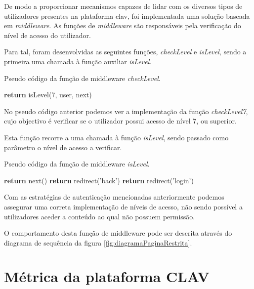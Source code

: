 De modo a proporcionar mecanismos capazes de lidar com os diversos tipos de utilizadores presentes na plataforma \gls{clav}, foi implementada uma solução baseada em \emph{middleware}. As funções de \emph{middleware} são responsáveis pela verificação do nível de acesso do utilizador. 

Para tal, foram desenvolvidas as seguintes funções, \emph{checkLevel} e \emph{isLevel}, sendo a primeira uma chamada à função auxiliar \emph{isLevel}.

\begin{algorithm}
    \caption{Pseudo código da função de middleware \emph{checkLevel}.}
    \begin{algorithmic}[1]
            \State \textbf{return} isLevel(7, user, next)
    \EndFunction
    \end{algorithmic}
\end{algorithm}

No pseudo código anterior podemos ver a implementação da função \emph{checkLevel7}, cujo objectivo é verificar se o utilizador possui acesso de nível 7, ou superior.

Esta função recorre a uma chamada à função \emph{isLevel}, sendo passado como parâmetro o nível de acesso a verificar.

\begin{algorithm}
    \caption{Pseudo código da função de middleware \emph{isLevel}.}
    \begin{algorithmic}[1]
                \State \textbf{return} next()
            \Else
                \State \textbf{return} redirect('back')
            \EndIf
        \Else
            \State \textbf{return} redirect('login')
        \EndIf
    \EndFunction
    \end{algorithmic}
\end{algorithm}

Com as estratégias de autenticação mencionadas anteriormente podemos assegurar uma correta implementação de níveis de acesso, não sendo possível a utilizadores aceder a conteúdo ao qual não possuem permissão.

O comportamento desta função de middleware pode ser descrita através do diagrama de sequência da figura \ref{fig:diagramaPaginaRestrita}.

\cleardoublepage
\section{Métrica da plataforma CLAV}

